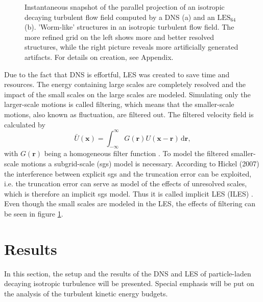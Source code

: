 \documentclass[11pt,a4paper,openany,oneside,parskip=half*]{article}
\renewcommand*\vec[1]{\boldsymbol{#1}}
\begin{document}
\begin{figure}[h]
\begin{minipage}[t]{0.5\textwidth}
        \label{64_velocity}
    \end{minipage}
    \captionsetup{width=0.97\linewidth}
\caption{Instantaneous snapshot of the parallel projection of an isotropic decaying turbulent flow field computed by a DNS (a) and an $\mathrm{LES_{64}}$ (b). 'Worm-like' structures in an isotropic turbulent flow field. The more refined grid on the left shows more and better resolved structures, while the right picture reveals more artificially generated artifacts. For details on creation, see Appendix.}
\label{comparisonLESDNS}
\end{figure}
Due to the fact that DNS is effortful, LES was created to save time and resources. The energy containing large scales are completely resolved and the impact of the small scales on the large scales are modeled.
\newline
Simulating only the larger-scale motions is called filtering, which means that the smaller-scale motions, also known as fluctuation, are filtered out. The filtered velocity field is calculated by 
\begin{equation}
\bar U(\vec{x}) = \int_{-\infty}^{\infty} G(\vec{r})U(\vec{x} - \vec{r})  \, \mathrm{d}\vec{r},
\end{equation}
with $G(\vec{r}) $ being a homogeneous filter function \cite{turbulentFlows}. To model the filtered smaller-scale motions a subgrid-scale (sgs) model is necessary. According to Hickel (2007) the interference between explicit sgs and the truncation error can be exploited, i.e. the truncation error can serve as model of the effects of unresolved scales, which is therefore an implicit sgs model. Thus it is called implicit LES (ILES) \cite{implicitLES}.
\newline
Even though the small scales are modeled in the LES, the effects of filtering can be seen in figure \ref{comparisonLESDNS}.
\newline
\pagebreak
\section{Results}
In this section, the setup and the results of the DNS and LES of particle-laden decaying isotropic turbulence will be presented. Special emphasis will be put on the analysis of the turbulent kinetic energy budgets.
\newline
\end{document}
